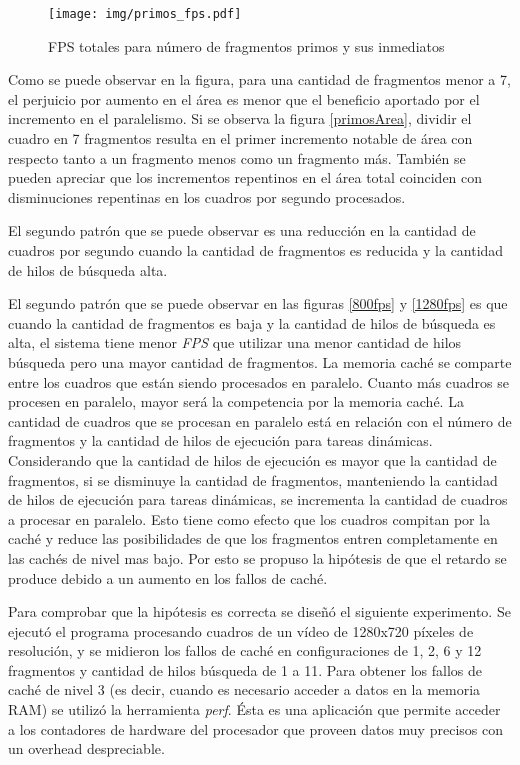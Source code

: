 \begin{figure}[!h]

	\texttt{[image: img/primos\_fps.pdf]}
	\caption{FPS totales para número de fragmentos primos y sus inmediatos}
	\label{primosFPS}

\end{figure}

Como se puede observar en la figura, para una cantidad de fragmentos menor a 7,
el perjuicio por aumento en el área es menor que el beneficio aportado por el
incremento en el paralelismo. Si se observa la figura \ref{primosArea}, dividir
el cuadro en 7 fragmentos resulta en el primer incremento notable de área con
respecto tanto a un fragmento menos como un fragmento más. También se pueden
apreciar que los incrementos repentinos en el área total coinciden con
disminuciones repentinas en los cuadros por segundo procesados.

El segundo patrón
que se puede observar es una reducción en la cantidad de cuadros por segundo
cuando la cantidad de fragmentos es reducida y la cantidad de hilos de búsqueda
alta.

El segundo patrón que se puede observar en las figuras \ref{800fps} y
\ref{1280fps} es que cuando la cantidad de fragmentos es baja y la cantidad de
hilos de búsqueda es alta, el sistema tiene menor \emph{FPS} que utilizar una
menor cantidad de hilos búsqueda pero una mayor cantidad de fragmentos. La
memoria caché se comparte entre los cuadros que están siendo procesados en
paralelo. Cuanto más cuadros se procesen en paralelo, mayor será la competencia
por la memoria caché. La cantidad de cuadros que se procesan en paralelo está en
relación con el número de fragmentos y la cantidad de hilos de ejecución para
tareas dinámicas. Considerando que la cantidad de hilos de ejecución es mayor
que la cantidad de fragmentos, si se disminuye la cantidad de fragmentos,
manteniendo la cantidad de hilos de ejecución para tareas dinámicas, se
incrementa la cantidad de cuadros a procesar en paralelo. Esto tiene como
efecto que los cuadros compitan por la caché y reduce las posibilidades de que
los fragmentos entren completamente en las cachés de nivel mas bajo. Por esto se
propuso la hipótesis de que el retardo se produce debido a un aumento en los
fallos de caché.

Para comprobar que la hipótesis es correcta se diseñó el siguiente experimento.
Se ejecutó el programa procesando cuadros de un vídeo de 1280x720 píxeles de
resolución, y se midieron los fallos de caché en configuraciones de 1, 2, 6 y 12
fragmentos y cantidad de hilos búsqueda de 1 a 11. Para obtener los fallos de
caché de nivel 3 (es decir, cuando es necesario acceder a datos en la memoria
RAM) se utilizó la herramienta \emph{perf}. Ésta es una aplicación que permite
acceder a los contadores de hardware del procesador que proveen datos muy
precisos con un overhead despreciable.

